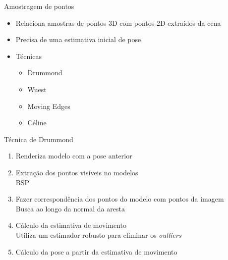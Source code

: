 \documentclass{beamer}
\begin{document}
\begin{frame}{Amostragem de pontos}
    \begin{itemize}
        \item Relaciona amostras de pontos 3D com pontos 2D extraídos da cena
        \item Precisa de uma estimativa inicial de pose
        \item Técnicas
            \begin{itemize}
                \item Drummond
                \item Wuest
                \item Moving Edges
                \item Céline
            \end{itemize}
    \end{itemize}
\end{frame}

\begin{frame}{Técnica de Drummond}
    \begin{enumerate}
        \item Renderiza modelo com a pose anterior
        \item Extração dos pontos visíveis no modelos \\
            BSP
        \item Fazer correspondência dos pontos do modelo com pontos da imagem \\
            Busca ao longo da normal da aresta
        \item Cálculo da estimativa de movimento \\
            Utiliza um estimador robusto para eliminar os \emph{outliers}
        \item Cálculo da pose a partir da estimativa de movimento
    \end{enumerate}
\end{frame}
\end{document}
